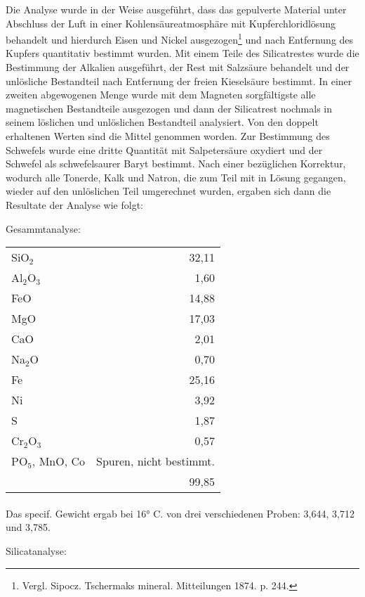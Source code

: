 \documentclass[a4paper, 11pt, oneside]{article}
\begin{document}
Die Analyse wurde in der Weise ausgeführt, dass das gepulverte Material unter Abschluss der Luft in einer Kohlensäureatmosphäre mit Kupferchloridlösung behandelt und hierdurch Eisen und Nickel ausgezogen\footnote{Vergl. Sipocz. Tschermaks mineral. Mitteilungen 1874. p. 244.} und nach Entfernung des Kupfers quantitativ bestimmt wurden. Mit einem Teile des Silicatrestes wurde die Bestimmung der Alkalien ausgeführt, der Rest mit Salzsäure behandelt und der unlösliche Bestandteil nach Entfernung der freien Kieselsäure bestimmt. In einer zweiten abgewogenen Menge wurde mit dem Magneten sorgfältigste alle magnetischen Bestandteile ausgezogen und dann der Silicatrest nochmals in seinem löslichen und unlöslichen Bestandteil analysiert. Von den doppelt erhaltenen Werten sind die Mittel genommen worden. Zur Bestimmung des Schwefels wurde eine dritte Quantität mit Salpetersäure oxydiert und der Schwefel als schwefelsaurer Baryt bestimmt. Nach einer bezüglichen Korrektur, wodurch alle Tonerde, Kalk und Natron, die zum Teil mit in Lösung gegangen, wieder auf den unlöslichen Teil umgerechnet wurden, ergaben sich dann die Resultate der Analyse wie folgt:
\clearpage
\begin{center}
Gesammtanalyse:
\end{center}
\begin{center}
\begin{tabular}{ l r }
    SiO$_{2}$ & 32,11\\
    Al$_{2}$O$_{3}$ & 1,60\\
    FeO & 14,88\\
    MgO & 17,03\\
    CaO & 2,01\\
    Na$_{2}$O & 0,70\\
    Fe & 25,16\\
    Ni & 3,92\\
    S & 1,87\\
    Cr$_{2}$O$_{3}$ & 0,57\\
    PO$_{5}$, MnO, Co & Spuren, nicht bestimmt.\\
     & 99,85
\end{tabular}
\end{center}
\paragraph{}
Das specif. Gewicht ergab bei 16° C. von drei verschiedenen Proben: 3,644, 3,712 und 3,785.
\begin{center}
Silicatanalyse:
\end{center}
\end{document}

